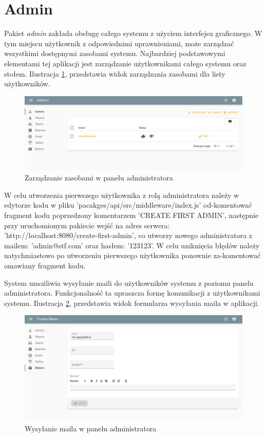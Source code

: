 \section{Admin}

Pakiet \textit{admin} zakłada obsługę całego systemu z użyciem interfejsu graficznego. W tym miejscu użytkownik z odpowiednimi uprawnieniami, może zarządzać wszystkimi dostępnymi zasobami systemu. Najbardziej podstawowymi elementami tej aplikacji jest zarządzanie użytkownikami całego systemu oraz stołem. Ilustracja \ref{fig:admin-manage-resource}, przedstawia widok zarządzania zasobami dla listy użytkowników.

\begin{figure}[h!]
  \centering
    \includegraphics[width=\textwidth]{images/admin/adminsList.png}
  \caption{Zarządzanie zasobami w panelu administratora}
  \label{fig:admin-manage-resource}
\end{figure}

W celu utworzenia pierwszego użytkownika z rolą administratora należy w edytorze kodu w pliku 'pacakges/api/src/middleware/index.js' od-komentować fragment kodu poprzedzony komentarzem 'CREATE FIRST ADMIN', następnie przy uruchomionym pakiecie wejść na adres serwera: 'http://localhost:8080/create-first-admin', co utworzy nowego administratora z mailem: 'admin@stf.com' oraz hasłem: '123123'. W celu uniknięcia błędów należy natychmiastowo po utworzeniu pierwszego użytkownika ponownie za-komentować omawiany fragment kodu.

\newpage

System umożliwia wysyłanie maili do użytkowników systemu z poziomu panelu administratora. Funkcjonalność ta upraszcza formę komunikacji z użytkownikami systemu. Ilustracja \ref{fig:admin-send-mail}, przedstawia widok formularza wysyłania maila w aplikacji.

\begin{figure}[h!]
  \centering
    \includegraphics[width=\textwidth]{images/admin/mailer.png}
  \caption{Wysyłanie maila w panelu administratora}
  \label{fig:admin-send-mail}
\end{figure}

